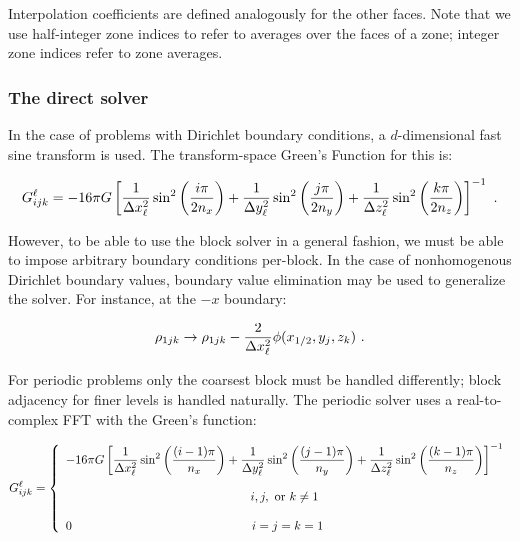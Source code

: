 Interpolation coefficients are defined analogously for the other faces.
Note that we use half-integer zone indices to refer to averages over the
faces of a zone; integer zone indices refer to zone averages.

\subsubsection{The direct solver}
\label{Sec:direct solver}

In the case of problems with Dirichlet boundary conditions, a $d$-dimensional
fast sine transform is used.  The transform-space Green's Function for this is:

\begin{equation}
G^\ell_{ijk} = -16\pi G\left[ {1\over{\Delta x_\ell^2}}\sin^2\left({i\pi\over
2n_x}\right) + {1\over{\Delta y_\ell^2}}\sin^2\left({j\pi\over 2n_y}\right) +
{1\over{\Delta z_\ell^2}}\sin^2\left({k\pi\over 2n_z}\right)\right]^{-1}\ .
\end{equation} 

However, to be able to use the block solver in a general fashion, we must be
able to impose arbitrary boundary conditions per-block. In the case of
nonhomogenous Dirichlet boundary values, boundary value elimination may be used
to generalize the solver.  For instance, at the $-x$ boundary:

\begin{equation}
\label{Eqn:bvelim}
\rho_{1jk} \rightarrow \rho_{1jk} - {2\over\Delta x_\ell^2}\phi(x_{1/2},y_j,z_k)\ .
\end{equation}

For periodic problems only the coarsest block must be handled differently; block
adjacency for finer levels is handled naturally.  The periodic solver uses a
real-to-complex FFT with the Green's function:

\begin{equation}
G^\ell_{ijk} = \left\{\begin{array}{ll}\displaystyle {-16\pi G\left[
{1\over{\Delta x_\ell^2}}\sin^2\left({(i-1)\pi\over n_x}\right) + {1\over{\Delta
y_\ell^2}}\sin^2\left({(j-1)\pi\over n_y}\right) + {1\over{\Delta
z_\ell^2}}\sin^2\left({(k-1)\pi\over n_z}\right)\right]^{-1}}\\
\\
                               \hfill i, j, {\rm\ or\ } k \ne 1 \\
\\
\displaystyle
                   0\hfill i = j = k = 1 
                  \end{array} \right.
\end{equation}

